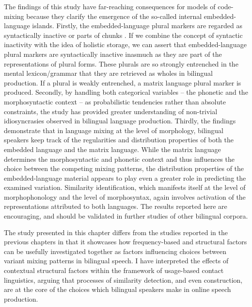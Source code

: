 The findings of this study have far-reaching consequences for models of code-mixing because they clarify the emergence of the so-called internal embedded-language islands. Firstly, the embedded-language plural markers are regarded as syntactically inactive \citep[92]{myers-scotton-contact-2002} or parts of chunks \citep[98]{backus-evidence-1999}. If we combine the concept of syntactic inactivity with the idea of holistic storage, we can assert that embedded-language plural markers are syntactically inactive inasmuch as they are part of the representations of plural forms. These plurals are so strongly entrenched in the mental lexicon/grammar that they are retrieved as wholes in bilingual production. If a plural is weakly entrenched, a matrix language plural marker is produced. Secondly, by handling both categorical variables -- the phonetic and the morphosyntactic context -- as probabilistic tendencies rather than absolute constraints, the study has provided greater understanding of non-trivial idiosyncrasies observed in bilingual language production. Thirdly, the findings demonstrate that in language mixing at the level of morphology, bilingual speakers keep track of the regularities and distribution properties of both the embedded language and the matrix language. While the matrix language determines the morphosyntactic and phonetic context and thus influences the choice between the competing mixing patterns, the distribution properties of the embedded-language material appears to play even a greater role in predicting the examined variation. Similarity identification, which manifests itself at the level of morphophonology and the level of morphosyntax, again involves activation of the representations attributed to both languages. The results reported here are encouraging, and should be validated in further studies of other bilingual corpora.

The study presented in this chapter differs from the studies reported in the previous chapters in that it showcases how frequency-based and structural factors can be usefully investigated together as factors influencing choices between variant mixing patterns in bilingual speech. I have interpreted the effects of contextual structural factors within the framework of usage-based contact linguistics, arguing that processes of similarity detection, and even construction, are at the core of the choices which bilingual speakers make in online speech production.
